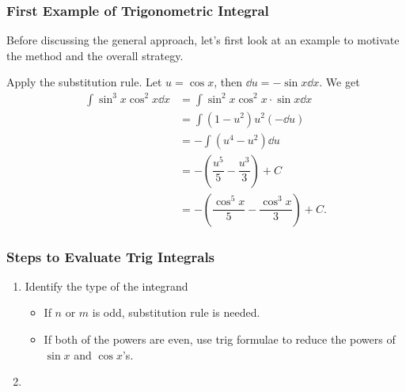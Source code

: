 \subsubsection{First Example of Trigonometric Integral}
Before discussing the general approach, let's first look at an example to motivate the method and the overall strategy.
\begin{ex} \leavevmode
    Apply the substitution rule. Let $u = \cos x$, then $\dd u = -\sin x \dd x$. We get
    \begin{align*}
        \int \sin^3 x \cos^2 x \dd x &= \int \sin^2 x \cos^2 x \cdot \sin x \dd x  \tag{substitution $u = \cos x$}\\
        &= \int (1 - u^2) u^2 (-\dd u) \\
        &= -\int (u^4 - u^2) \dd u \\
        &= -\left(\dfrac{u^5}{5} - \dfrac{u^3}{3}\right) + C \tag{Constant $C$ indefinite integral} \\
        &= -\left(\dfrac{\cos^5 x}{5} - \dfrac{\cos^3 x}{3}\right) + C.
    \end{align*}
\end{ex}

\subsubsection{Steps to Evaluate Trig Integrals}
\begin{enumerate}
    \item Identify the type of the integrand 
    \begin{itemize}
        \item If $n$ or $m$ is odd, substitution rule is needed. 
        \item If both of the powers are even, use trig formulae to reduce the powers of $\sin x$ and $\cos x$'s.
    
    \end{itemize}
    
    
    \item {}
\end{enumerate}


